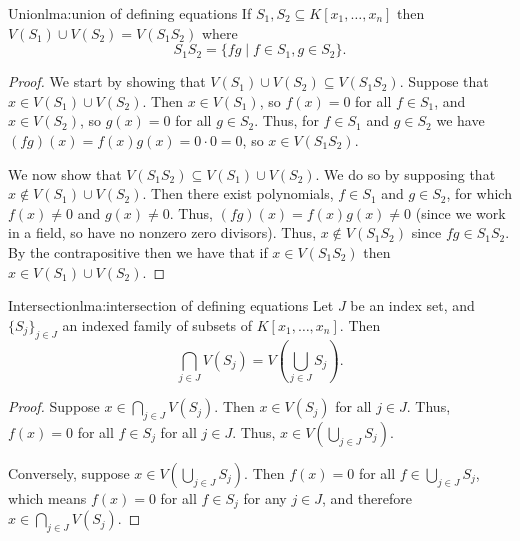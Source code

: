 \documentclass[fleqn]{NotesClass}
\begin{document}
    \begin{lma}{Union}{lma:union of defining equations}
        If \(S_1, S_2 \subseteq K[x_1, \dotsc, x_n]\) then \(V(S_1) \cup V(S_2) = V(S_1 S_2)\) where
        \begin{equation}
            S_1 S_2 = \{fg \mid f \in S_1, g \in S_2\}.
        \end{equation}
        \begin{proof}
            We start by showing that \(V(S_1) \cup V(S_2) \subseteq V(S_1 S_2)\).
            Suppose that \(x \in V(S_1) \cup V(S_2)\).
            Then \(x \in V(S_1)\), so \(f(x) = 0\) for all \(f \in S_1\), and \(x \in V(S_2)\), so \(g(x) = 0\) for all \(g \in S_2\).
            Thus, for \(f \in S_1\) and \(g \in S_2\) we have \((fg)(x) = f(x)g(x) = 0 \cdot 0 = 0\), so \(x \in V(S_1S_2)\).
            
            We now show that \(V(S_1S_2) \subseteq V(S_1) \cup V(S_2)\).
            We do so by supposing that \(x \notin V(S_1) \cup V(S_2)\).
            Then there exist polynomials, \(f \in S_1\) and \(g \in S_2\), for which \(f(x) \ne 0\) and \(g(x) \ne 0\).
            Thus, \((fg)(x) = f(x)g(x) \ne 0\) (since we work in a field, so have no nonzero zero divisors).
            Thus, \(x \notin V(S_1S_2)\) since \(fg \in S_1S_2\).
            By the contrapositive then we have that if \(x \in V(S_1S_2)\) then \(x \in V(S_1) \cup V(S_2)\).
        \end{proof}
    \end{lma}
    
    \begin{lma}{Intersection}{lma:intersection of defining equations}
        Let \(J\) be an index set, and \(\{S_j\}_{j \in J}\) an indexed family of subsets of \(K[x_1, \dotsc, x_n]\).
        Then
        \begin{equation}
            \bigcap_{j \in J} V(S_j) = V\left( \bigcup_{j \in J} S_j \right).
        \end{equation}
        \begin{proof}
            Suppose \(x \in \bigcap_{j \in J} V(S_j)\).
            Then \(x \in V(S_j)\) for all \(j \in J\).
            Thus, \(f(x) = 0\) for all \(f \in S_j\) for all \(j \in J\).
            Thus, \(x \in V\left( \bigcup_{j \in J} S_j \right)\).
            
            Conversely, suppose \(x \in V\left( \bigcup_{j \in J} S_j \right)\).
            Then \(f(x) = 0\) for all \(f \in \bigcup_{j \in J} S_j\), which means \(f(x) = 0\) for all \(f \in S_j\) for any \(j \in J\), and therefore \(x \in \bigcap_{j \in J} V(S_j)\).
        \end{proof}
    \end{lma}
    
\end{document}

